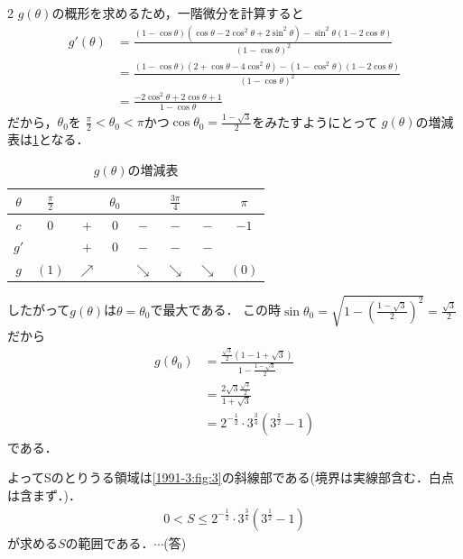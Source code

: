 \documentclass[../../../../main.tex]{subfiles}
\begin{document}
\begin{multicols}{2}
  $g(\theta)$の概形を求めるため，一階微分を計算すると
  \begin{align*}
    g'(\theta)
     & = \frac{(1-\cos\theta)(\cos\theta-2\cos^2\theta+2\sin^2\theta)-\sin^2\theta(1-2\cos\theta)}{(1-\cos\theta)^2} \\
     & = \frac{(1-\cos\theta)(2+\cos\theta-4\cos^2\theta)-(1-\cos^2\theta)(1-2\cos\theta)}{(1-\cos\theta)^2}         \\
     & = \frac{-2\cos^2\theta+2\cos\theta+1}{1-\cos\theta}
  \end{align*}
  だから，$\theta_0 $を $\frac{\pi}{2}<\theta_0<\pi $かつ$ \cos\theta_0 = \frac{1-\sqrt{3}}{2} $をみたすようにとって
  $g(\theta)$の増減表は\cref{1991-3:table:1}となる．

  \begin{table}[H]
    \centering
    \caption{$g(\theta)$の増減表}
    \label{1991-3:table:1}
    \begin{tabular}{c||c|c|c|c|c|c|c|}
      $\theta$ & $\frac{\pi}{2}$ &            & $\theta_0$ &            & $\frac{3\pi}{4}$ &            & $\pi$ \\ \hline
      $c$      & $0$             & $+$        & $0$        & $-$        & $-$              & $-$        & $-1$  \\ \hline
      $g'$     &                 & $+$        & $0$        & $-$        & $-$              & $-$        &       \\ \hline
      $g$      & $(1)$           & $\nearrow$ &            & $\searrow$ & $\searrow$       & $\searrow$ & $(0)$
    \end{tabular}
  \end{table}

  したがって$g(\theta)$は$\theta = \theta_0$で最大である．
  この時$\sin\theta_0 = \sqrt{1 - \left(\frac{1-\sqrt{3}}{2}\right)^2} = \frac{\sqrt{3}}{2}$だから
  \begin{align*}
    g(\theta_0)
     & = \frac{\frac{\sqrt{3}}{2}(1-1+\sqrt{3})}{1-\frac{1-\sqrt{3}}{2}} \\
     & = \frac{2\sqrt{3}\frac{\sqrt{3}}{2}}{1+\sqrt{3}}                  \\
     & = 2^{-\frac{1}{2}} \cdot 3^{\frac{3}{4}}(3^{\frac{1}{2}}-1)
  \end{align*}
  である．

  よってSのとりうる領域は\cref{1991-3:fig:3}の斜線部である(境界は実線部含む．白点は含まず．)．
  \begin{align*}
    0 < S \le 2^{-\frac{1}{2}} \cdot 3^{\frac{3}{4}}\left(3^{\frac{1}{2}}-1\right)
  \end{align*}
  が求める$S$の範囲である．$\cdots$(答)


\end{multicols}
\end{document}
